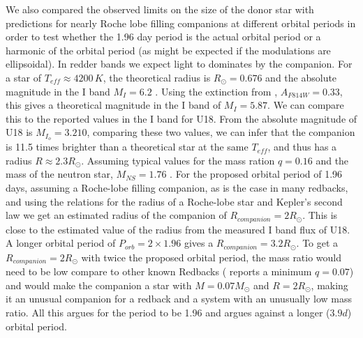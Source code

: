 \documentclass[fleqn,usenatbib,useAMS,letters]{mnras}
\newcommand{\kms}{\,km\,s$^{-1}$} %
\begin{document}
 
 We also compared the observed limits on the size of the donor star with predictions for nearly Roche lobe filling companions at different orbital periods in order to test whether the 1.96 day period is the actual orbital period or a harmonic of the orbital period (as might be expected if the modulations are ellipsoidal). In redder bands we expect light to dominates by the companion. For a star of $T_{eff} \approx 4200 \, K$, the theoretical radius is $R_\odot = 0.676$ and the absolute magnitude in the I band  $M_{I} = 6.2$ \citep{Mamajek2013}. Using the extinction from \cite{Richer2008}, $A_{F814W} = 0.33$, this gives a theoretical magnitude in the I band of $M_I = 5.87$. We can compare this to the reported values in the I band for U18. From \cite{Pallanca2017Halpha} the absolute magnitude of U18 is  $M_{I_o} = 3.210$, comparing these two values, we can infer that the companion is 11.5 times brighter than a theoretical star at the same $T_{eff}$, and thus has a radius $R \approx 2.3 R_\odot$. Assuming typical values for the mass ration $q=0.16$ and the mass of the neutron star, $M_{NS}=1.76$ \citep{Strader2019Redbacks}. For the proposed orbital period of 1.96 days, assuming a Roche-lobe filling companion, as is the case in many redbacks, and using the \cite{Paczy1971} relations for the radius of a Roche-lobe star and Kepler's second law we get an estimated radius of the companion of $R_{companion} = 2 R_\odot$. This is close to the estimated value of the radius from the measured I band flux of U18. A longer orbital period of $P_{orb}=2\times 1.96$ gives a $R_{companion} = 3.2 R_{\odot}$. To get a $R_{companion} = 2 R_\odot$ with twice the proposed orbital period, the mass ratio would need to be low compare to other known Redbacks (\cite{Strader2019Redbacks} reports a minimum $q= 0.07$) and would make the companion a star with $M =0.07 M_\odot$ and $R= 2 R_\odot$, making it an unusual companion for a redback and a system with an unusually low mass ratio. All this argues for the period to be 1.96 and argues against a longer ($3.9 d$) orbital period. 
 
 
 
\end{document}
